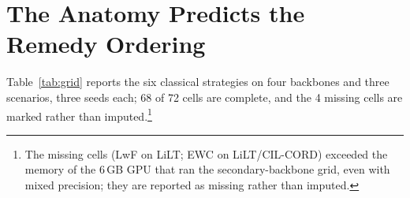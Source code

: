 \documentclass{article}
\begin{document}
\section{The Anatomy Predicts the Remedy Ordering}
\label{sec:benchmark}
Table~\ref{tab:grid} reports the six classical strategies on four backbones and three scenarios, three seeds each; 68 of 72 cells are complete, and the 4 missing cells are marked rather than imputed.\footnote{The missing cells (LwF on LiLT; EWC on LiLT/CIL-CORD) exceeded the memory of the 6\,GB GPU that ran the secondary-backbone grid, even with mixed precision; they are reported as missing rather than imputed.}

\begin{table}[t]
\centering\small
\caption{Generality grid: average accuracy (mean $\pm$ s.d., three seeds) of the six classical strategies on four backbones and three scenarios. Joint is the pooled-data oracle. Grey cells did not fit the available GPU memory (see text). Replay reaches the joint bound on DIL on every backbone; regularisation and distillation stay near the naive floor; on CIL-CORD every method, replay included, sits near the floor.}
\label{tab:grid}
\setlength{\tabcolsep}{4pt}
\end{table}
\end{document}
